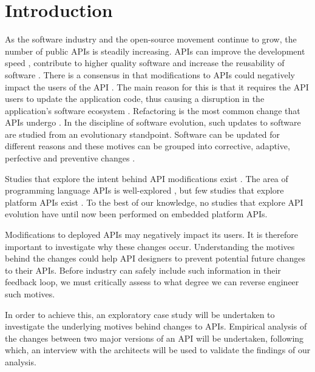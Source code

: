 \documentclass{sig-alternate}
\begin{document}
\section{Introduction} \label{introduction}
As the software industry and the open-source movement continue to grow, the number of public APIs is steadily increasing. APIs can improve the development speed \cite{stylos2006comparing}, contribute to higher quality software \cite{stylos2006comparing} and increase the reusability of software \cite{afonso2012evaluating}. There is a consensus in that modifications to APIs could negatively impact the users of the API \cite{google_talk} \cite{mcdonnell2013empirical} \cite{robbes2012developers} \cite{henning2007api}. The main reason for this is that it requires the API users to update the application code, thus causing a disruption in the application's software ecosystem \cite{messerschmitt2005software}. Refactoring is the most common change that APIs undergo \cite{dig2005role} \cite{xing2006refactoring}. 
In the discipline of software evolution, such updates to software are studied from an evolutionary standpoint. Software can be updated for different reasons and these motives can be grouped into corrective, adaptive, perfective and preventive changes \cite{lientz1980software}. 

Studies that explore the intent behind API modifications exist \cite{hou2011exploring}. The area of programming language APIs is well-explored \cite{hou2011exploring} \cite{shi2011empirical}, but few studies that explore platform APIs exist \cite{robbes2012developers}. To the best of our knowledge, no studies that explore API evolution have until now been performed on embedded platform APIs. 


Modifications to deployed APIs may negatively impact its users. It is therefore important to investigate why these changes occur. Understanding the motives behind the changes could help API designers to  prevent potential future changes to their APIs. Before industry can safely include such information in their feedback loop, we must critically assess to what degree we can reverse engineer such motives. 

In order to achieve this, an exploratory case study will be undertaken to investigate the underlying motives behind changes to APIs. Empirical analysis of the changes between two major versions of an API will be undertaken, following which, an interview with the architects will be used to validate the findings of our analysis. 
\end{document}
